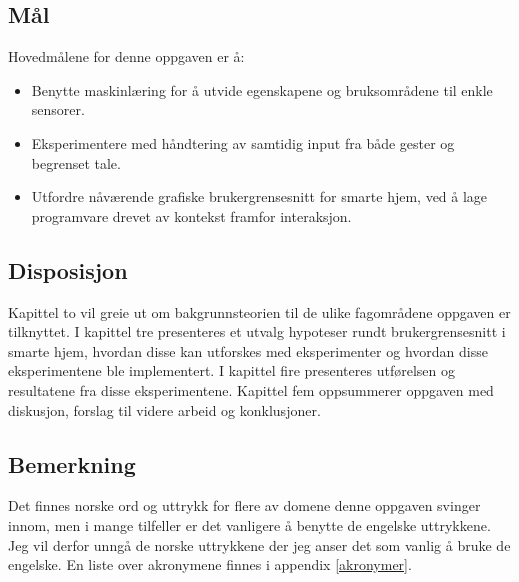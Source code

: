 \subsection*{Mål}
Hovedmålene for denne oppgaven er å:
\begin{itemize}
\item Benytte maskinlæring for å utvide egenskapene og bruksområdene til enkle sensorer.
\item Eksperimentere med håndtering av samtidig input fra både gester og begrenset tale.
\item Utfordre nåværende grafiske brukergrensesnitt for smarte hjem, ved å lage programvare drevet av kontekst framfor interaksjon.
\end{itemize}

\subsection*{Disposisjon}
Kapittel to vil greie ut om bakgrunnsteorien til de ulike fagområdene oppgaven er tilknyttet. I kapittel tre presenteres et utvalg hypoteser rundt brukergrensesnitt i smarte hjem, hvordan disse kan utforskes med eksperimenter og hvordan disse eksperimentene ble implementert. I kapittel fire presenteres utførelsen og resultatene fra disse eksperimentene. Kapittel fem oppsummerer oppgaven med diskusjon, forslag til videre arbeid og konklusjoner.

\subsection*{Bemerkning}
Det finnes norske ord og uttrykk for flere av domene denne oppgaven svinger innom, men i mange tilfeller er det vanligere å benytte de engelske uttrykkene. Jeg vil derfor unngå de norske uttrykkene der jeg anser det som vanlig å bruke de engelske. En liste over akronymene finnes i appendix \ref{akronymer}.